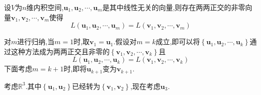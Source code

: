 \begin{formal}
    \begin{theorem}\label{thm:Gram-Schmidt正交化方法}
        设$V$为$n$维内积空间,$\bm{u}_1,\bm{u}_2,\cdots,\bm{u}_m$是其中线性无关的向量,则存在两两正交的非零向量$\bm{v}_1,\bm{v}_2,\cdots,\bm{v}_m$使得\[
        L\left(
            \bm{u}_1,\bm{u}_2,\cdots,\bm{u}_m
        \right)=L\left(
            \bm{v}_1,\bm{v}_2,\cdots,\bm{v}_m
        \right)
        \]
    \end{theorem}
    \begin{Proof}
        对$m$进行归纳,当$m=1$时,取$\bm{v}_1=\bm{u}_1$.假设对$m=k$成立,即可以将$\left\{
            \bm{u}_1,\bm{u}_2,\cdots,\bm{u}_k
        \right\}$通过这种方法成为两两正交且非零的$\left\{
            \bm{v}_1,\bm{v}_2,\cdots,\bm{v}_k
        \right\}$且\[
        L\left(
            \bm{u}_1,\bm{u}_2,\cdots,\bm{u}_k
        \right)=L\left(
            \bm{v}_1,\bm{v}_2,\cdots,\bm{v}_k
        \right)
        \]下面考虑$m=k+1$时,即将$\bm{u}_{k+1}$变为$\bm{v}_{k+1}$.

        考虑$\mathbb{R}^3.$其中$\left\{
            \bm{u}_1,\bm{u}_2
        \right\}$已经转为$\left\{
            \bm{v}_1,\bm{v}_2
            \right\}$,现在考虑$\bm{u}_3$.




\begin{tikzpicture}[x=0.75pt,y=0.75pt,yscale=-1,xscale=1]


\end{tikzpicture}
\end{Proof}
\end{formal}
